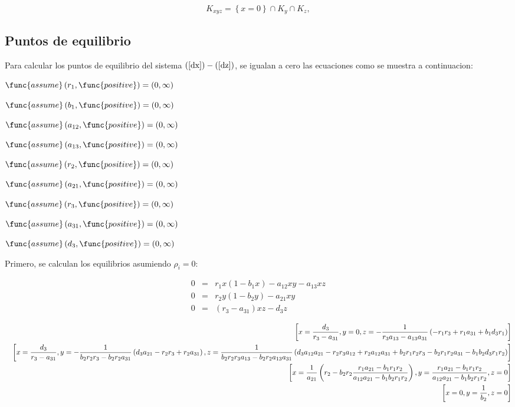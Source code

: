 \documentclass[letterpaper,11pt]{article}
\begin{document}
\begin{equation*}
K_{xyz}=\left\{ x=0\right\} \cap K_{y}\cap K_{z},
\end{equation*}

\subsection{Puntos de equilibrio}

Para calcular los puntos de equilibrio del sistema $\left( \ref{dx}\right)
-\left( \ref{dz}\right) $, se igualan a cero las ecuaciones como se muestra
a continuacion:

$\func{assume}\left( r_{1},\func{positive}\right) =\allowbreak \left(
0,\infty \right) $

$\func{assume}\left( b_{1},\func{positive}\right) =\allowbreak \left(
0,\infty \right) $

$\func{assume}\left( a_{12},\func{positive}\right) =\allowbreak \left(
0,\infty \right) $

$\func{assume}\left( a_{13},\func{positive}\right) =\allowbreak \left(
0,\infty \right) $

$\func{assume}\left( r_{2},\func{positive}\right) =\allowbreak \left(
0,\infty \right) $

$\func{assume}\left( a_{21},\func{positive}\right) =\allowbreak \left(
0,\infty \right) $

$\func{assume}\left( r_{3},\func{positive}\right) =\allowbreak \left(
0,\infty \right) $

$\func{assume}\left( a_{31},\func{positive}\right) =\allowbreak \left(
0,\infty \right) $

$\func{assume}\left( d_{3},\func{positive}\right) =\allowbreak \left(
0,\infty \right) $

\bigskip Primero, se calculan los equilibrios asumiendo $\rho _{i}=0:$

\begin{eqnarray*}
0 &=&r_{1}x(1-b_{1}x)-a_{12}xy-a_{13}xz \\
0 &=&r_{2}y(1-b_{2}y)-a_{21}xy \\
0 &=&(r_{3}-a_{31})xz-d_{3}z
\end{eqnarray*}

\begin{eqnarray*}
&&\left[ x=\frac{d_{3}}{r_{3}-a_{31}},y=0,z=-\frac{1}{%
r_{3}a_{13}-a_{13}a_{31}}\left(
-r_{1}r_{3}+r_{1}a_{31}+b_{1}d_{3}r_{1}\right) \right] \\
&&\left[ x=\frac{d_{3}}{r_{3}-a_{31}},y=-\frac{1}{%
b_{2}r_{2}r_{3}-b_{2}r_{2}a_{31}}\left(
d_{3}a_{21}-r_{2}r_{3}+r_{2}a_{31}\right) ,z=\frac{1}{%
b_{2}r_{2}r_{3}a_{13}-b_{2}r_{2}a_{13}a_{31}}\left(
d_{3}a_{12}a_{21}-r_{2}r_{3}a_{12}+r_{2}a_{12}a_{31}+b_{2}r_{1}r_{2}r_{3}-b_{2}r_{1}r_{2}a_{31}-b_{1}b_{2}d_{3}r_{1}r_{2}\right) %
\right] \\
&&\left[ x=\frac{1}{a_{21}}\left( r_{2}-b_{2}r_{2}\frac{%
r_{1}a_{21}-b_{1}r_{1}r_{2}}{a_{12}a_{21}-b_{1}b_{2}r_{1}r_{2}}\right) ,y=%
\frac{r_{1}a_{21}-b_{1}r_{1}r_{2}}{a_{12}a_{21}-b_{1}b_{2}r_{1}r_{2}},z=0%
\right] \\
&&\left[ x=0,y=\frac{1}{b_{2}},z=0\right]
\end{eqnarray*}
\end{document}
